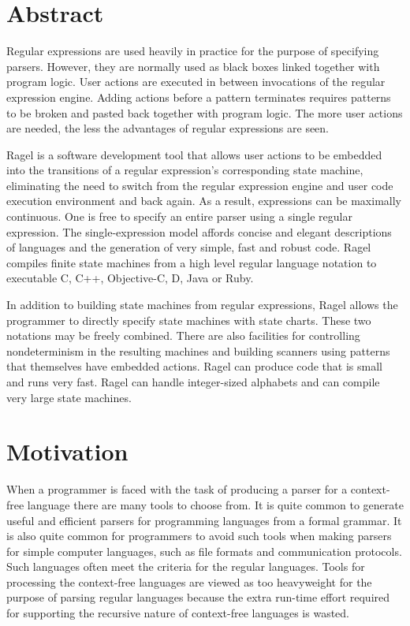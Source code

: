 \documentclass[letterpaper,11pt,oneside]{book}
\begin{document}
\section{Abstract}

Regular expressions are used heavily in practice for the purpose of specifying
parsers. However, they are normally used as black boxes linked together with
program logic.  User actions are executed in between invocations of the regular
expression engine. Adding actions before a pattern terminates requires patterns
to be broken and pasted back together with program logic. The more user actions
are needed, the less the advantages of regular expressions are seen. 

Ragel is a software development tool that allows user actions to be 
embedded into the transitions of a regular expression's corresponding state
machine, eliminating the need to switch from the regular expression engine and
user code execution environment and back again. As a result, expressions can be
maximally continuous.  One is free to specify an entire parser using a single
regular expression.  The single-expression model affords concise and elegant
descriptions of languages and the generation of very simple, fast and robust
code.  Ragel compiles finite state machines from a high level regular language
notation to executable C, C++, Objective-C, D, Java or Ruby.

In addition to building state machines from regular expressions, Ragel allows
the programmer to directly specify state machines with state charts. These two
notations may be freely combined. There are also facilities for controlling
nondeterminism in the resulting machines and building scanners using patterns
that themselves have embedded actions. Ragel can produce code that is small and
runs very fast. Ragel can handle integer-sized alphabets and can compile very
large state machines.

\section{Motivation}

When a programmer is faced with the task of producing a parser for a
context-free language there are many tools to choose from. It is quite common
to generate useful and efficient parsers for programming languages from a
formal grammar. It is also quite common for programmers to avoid such tools
when making parsers for simple computer languages, such as file formats and
communication protocols.  Such languages often meet the criteria for the
regular languages.  Tools for processing the context-free languages are viewed
as too heavyweight for the purpose of parsing regular languages because the extra
run-time effort required for supporting the recursive nature of context-free
languages is wasted.
\end{document}
